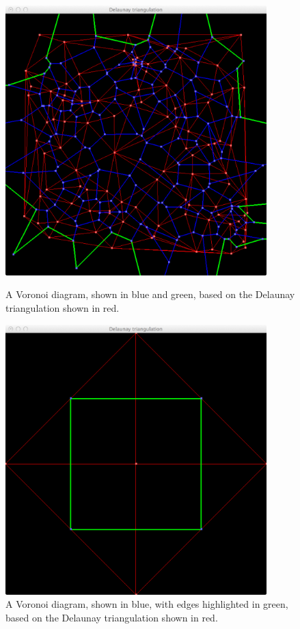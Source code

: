 \begin{figure}
	\begin{minipage}[t]{0.45\textwidth}
		\centering
		\includegraphics[width=0.9\textwidth]{./img/c_voronoi}
		\caption{A Voronoi diagram, shown in blue and green, based on the Delaunay triangulation shown in red.}
		\label{fig:c:voronoi}		
	\end{minipage}
	\hspace{0.1\textwidth}
	\begin{minipage}[t]{0.45\textwidth}
		\centering
		\includegraphics[width=0.9\textwidth]{./img/c_small_triangulation}
		\caption{A Voronoi diagram, shown in blue, with edges highlighted in green, based on the Delaunay triangulation shown in red.}
		\label{fig:c:voronoi_small}		
	\end{minipage}
\end{figure}


